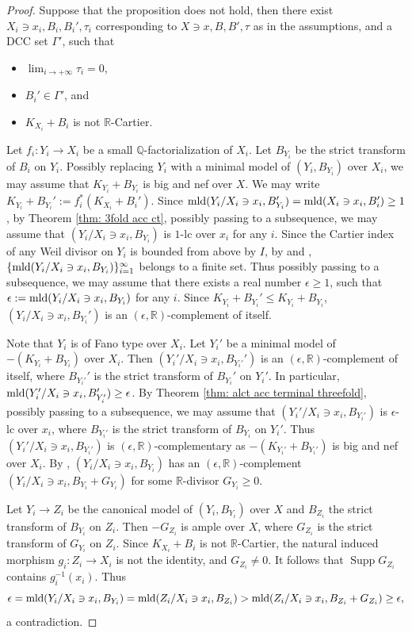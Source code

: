\documentclass[11pt]{amsart}
\numberwithin{equation}{section}
\newcommand\han[1]{\todo[color=yellow!40]{#1}} %
\newcommand{\Qq}{\mathbb{Q}}
\newcommand{\Rr}{\mathbb{R}}
\newcommand{\mld}{{\rm{mld}}}
\newcommand{\Supp}{\operatorname{Supp}}
\newcommand{\Ii}{{\Gamma}}
\theoremstyle{definition}
\theoremstyle{definition}
\begin{document}
\begin{proof}%
Suppose that the proposition does not hold, then there exist $X_i\ni x_i,B_i,B_i',\tau_i$ corresponding to $X\ni x,B,B',\tau$ as in the assumptions, and a DCC set $\Ii'$, such that
\begin{itemize}
    \item $\lim_{i\rightarrow+\infty}\tau_i=0$, 
    \item $B_i'\in\Ii'$, and
    \item $K_{X_i}+B_i$ is not $\Rr$-Cartier.
\end{itemize}
Let $f_i:Y_i\to X_i$ be a small $\Qq$-factorialization of $X_i$. Let $B_{Y_i}$ be the strict transform of $B_i$ on $Y_i$. Possibly replacing $Y_i$ with a minimal model of $(Y_i,B_{Y_i})$ over $X_i$, we may assume that $K_{Y_i}+B_{Y_i}$ is big and nef over $X$. We may write
$K_{Y_i}+B_{Y_i}':=f_i^{*}(K_{X_i}+B_{i}')$. Since $\mld(Y_i/X_i\ni x_i,B_{Y_i}')=\mld(X_i\ni x_i,B_i')\ge 1$, by Theorem \ref{thm: 3fold acc ct}, possibly passing to a subsequence, we may assume that $(Y_i/X_i\ni x_i,B_{Y_i})$ is $1$-lc over $x_i$ for any $i$. Since the Cartier index of any Weil divisor on $Y_i$ is bounded from above by $I$, by \cite[Theorem~1.2]{Nak16} and \cite[Theorem~0.1]{Amb99}, $\{\mld(Y_i/X_i\ni x_i,B_{Y_i})\}_{i=1}^{\infty}$ belongs to a finite set. Thus possibly passing to a subsequence, we may assume that there exists a real number $\epsilon\ge 1$, such that $\epsilon:=\mld(Y_i/X_i\ni x_i,B_{Y_i})$ for any $i$. Since $K_{Y_i}+B_{Y_i}'\le K_{Y_i}+B_{Y_i}$, $(Y_i/X_i\ni x_i,B_{Y_i}')$ is an $(\epsilon,\Rr)$-complement of itself. 

Note that $Y_i$ is of Fano type over $X_i$. Let $Y_i'$ be a minimal model of $-(K_{Y_i}+B_{Y_i})$ over $X_i$. Then $(Y_i'/X_i\ni x_i,B_{Y_i'}')$ is an $(\epsilon,\Rr)$-complement of itself, where $B_{Y_i'}'$ is the strict transform of $B_{Y_i}'$ on $Y_i'$. In particular, $\mld(Y_i'/X_i\ni x_i,B_{Y_i'}')\ge \epsilon$. By Theorem \ref{thm: alct acc terminal threefold}, possibly passing to a subsequence, we may assume that $(Y_i'/X_i\ni x_i,B_{Y_i'})$ is $\epsilon$-lc over $x_i$, where $B_{Y_i'}$ is the strict transform of $B_{Y_i}$ on $Y_i'$. Thus $(Y_i'/X_i\ni x_i,B_{Y_i'})$ is $(\epsilon,\Rr)$-complementary as $-(K_{Y_i'}+B_{Y_i'})$ is big and nef over $X_i$. By \cite[Lemma 3.13]{CH21}, $(Y_i/X_i\ni x_i,B_{Y_i})$ has an $(\epsilon,\Rr)$-complement $(Y_i/X_i\ni x_i,B_{Y_i}+G_{Y_i})$ for some $\Rr$-divisor $G_{Y_i}\ge0$.   

Let $Y_i\to Z_i$ be the canonical model of $({Y_i},B_{Y_i})$ over $X$ and $B_{Z_i}$ the strict transform of $B_{Y_i}$ on $Z_i$. Then $-G_{Z_i}$ is ample over $X$, where $G_{Z_i}$ is the strict transform of $G_{Y_i}$ on $Z_i$. Since $K_{X_i}+B_{i}$ is not $\Rr$-Cartier, the natural induced morphism $g_i:Z_i\to X_i$ is not the identity, and $G_{Z_i}\neq 0$. It follows that $\Supp G_{Z_i}$ contains $g_i^{-1}(x_i)$. Thus $$\epsilon=\mld(Y_i/X_i\ni x_i,B_{Y_i})=\mld(Z_i/X_i\ni x_i,B_{Z_i})>\mld(Z_i/X_i\ni x_i,B_{Z_i}+G_{Z_i})\ge\epsilon,$$ a contradiction.  
\end{proof}
\end{document}
